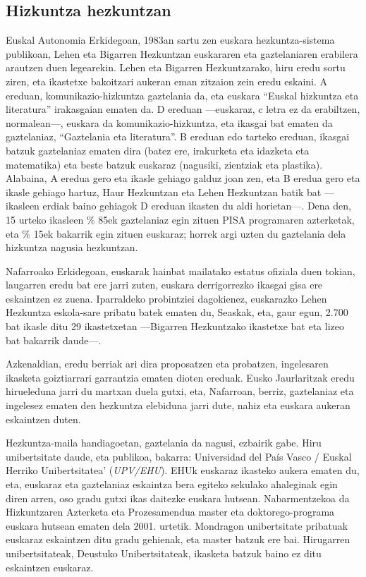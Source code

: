 \begin{multicols}{2}
\subsection{Hizkuntza hezkuntzan}
Euskal Autonomia Erkidegoan, 1983an sartu zen euskara hezkuntza-sistema publikoan, Lehen eta Bigarren Hezkuntzan euskararen eta gaztelaniaren erabilera arautzen duen legearekin. Lehen eta Bigarren Hezkuntzarako, hiru eredu sortu ziren, eta ikastetxe bakoitzari aukeran eman zitzaion zein eredu eskaini. A ereduan, komunikazio-hizkuntza gaztelania da, eta euskara “Euskal hizkuntza eta literatura” irakasgaian ematen da. D ereduan —euskaraz, c letra ez da erabiltzen, normalean—, euskara da komunikazio-hizkuntza, eta ikasgai bat ematen da gaztelaniaz, “Gaztelania eta literatura”. B ereduan edo tarteko ereduan, ikasgai batzuk gaztelaniaz ematen dira (batez ere, irakurketa eta idazketa eta matematika) eta beste batzuk euskaraz (nagusiki, zientziak eta plastika). Alabaina, A eredua gero eta ikasle gehiago galduz joan zen, eta B eredua gero eta ikasle gehiago hartuz, Haur Hezkuntzan eta Lehen Hezkuntzan batik bat —ikasleen erdiak baino gehiagok D ereduan ikasten du aldi horietan—. Dena den, 15 urteko ikasleen \% 85ek gaztelaniaz egin zituen PISA programaren \cite{BAS-Nota12} azterketak, eta \% 15ek bakarrik egin zituen euskaraz; horrek argi uzten du gaztelania dela hizkuntza nagusia hezkuntzan. 

Nafarroako Erkidegoan, euskarak hainbat mailatako estatus ofiziala duen tokian, laugarren eredu bat ere jarri zuten, euskara derrigorrezko ikasgai gisa ere eskaintzen ez zuena. Iparraldeko probintziei dagokienez, euskarazko Lehen Hezkuntza eskola-sare pribatu batek ematen du, Seaskak, eta, gaur egun, 2.700 bat ikasle ditu 29 ikastetxetan —Bigarren Hezkuntzako ikastetxe bat eta lizeo bat bakarrik daude—. 

Azkenaldian, eredu berriak ari dira proposatzen eta probatzen, ingelesaren ikasketa goiztiarrari garrantzia ematen dioten ereduak. Eusko Jaurlaritzak eredu hirueleduna jarri du martxan duela gutxi, eta, Nafarroan, berriz, gaztelaniaz eta ingelesez ematen den hezkuntza elebiduna jarri dute, nahiz eta euskara aukeran eskaintzen duten.  

Hezkuntza-maila handiagoetan, gaztelania da nagusi, ezbairik gabe. Hiru unibertsitate daude, eta publikoa, bakarra: Universidad del País Vasco / Euskal Herriko Unibertsitatea’ (\textit{UPV/EHU}). EHUk euskaraz ikasteko aukera ematen du, eta, euskaraz eta gaztelaniaz eskaintza bera egiteko sekulako ahaleginak egin diren arren, oso gradu gutxi ikas daitezke euskara hutsean. Nabarmentzekoa da Hizkuntzaren Azterketa eta Prozesamendua \cite{BAS-Nota13}  master eta doktorego-programa euskara hutsean ematen dela 2001. urtetik. Mondragon unibertsitate pribatuak euskaraz eskaintzen ditu gradu gehienak, eta master batzuk ere bai. Hirugarren unibertsitateak, Deustuko Unibertsitateak, ikasketa batzuk baino ez ditu eskaintzen euskaraz.


\end{multicols}
